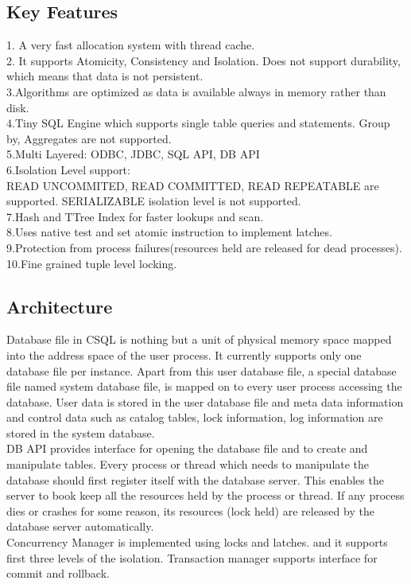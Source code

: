 \documentclass[12pt]{article}
\begin{document}
\subsection{Key Features}
\label{keyfeatures}
1. A very fast allocation system with thread cache.\\
2. It supports Atomicity, Consistency and Isolation. Does not support durability, which means that data is not persistent. \\
3.Algorithms are optimized as data is available always in memory rather than disk.\\
4.Tiny SQL Engine which supports single table queries and statements. Group by, Aggregates are not supported.\\
5.Multi Layered: ODBC, JDBC, SQL API, DB API\\
6.Isolation Level support:\\
READ UNCOMMITED, READ COMMITTED, READ REPEATABLE are supported. SERIALIZABLE isolation level is not supported.\\
7.Hash and TTree Index for faster lookups and scan. \\
8.Uses native test and set atomic instruction to implement latches.\\
9.Protection from process failures(resources held are released for dead processes).\\
10.Fine grained tuple level locking.\\

\subsection{Architecture}
\label{arch}
Database file in CSQL is nothing but a unit of physical memory space mapped into the address space of the user process. It currently supports only one database file per instance. Apart from this user database file, a special database file named system database file, is mapped on to every user process accessing the database. User data is stored in the user database file and meta data information and control data such as catalog tables, lock information, log information are stored in the system database. \\
DB API provides interface for opening the database file and to create and manipulate tables. Every process or thread which needs to manipulate the database should first register itself with the database server. This enables the server to book keep all the resources held by the process or thread. If any process dies or crashes for some reason, its resources (lock held) are released by the database server automatically. \\
Concurrency Manager is implemented using locks and latches. and it supports first three levels of the isolation. Transaction manager supports interface for commit and rollback.
\end{document}
